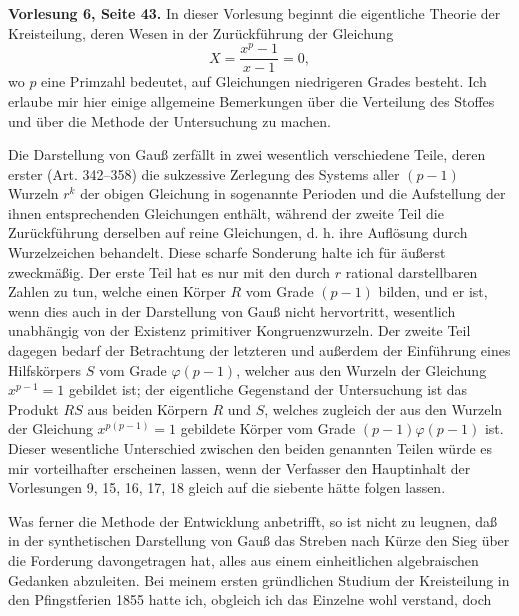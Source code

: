 \documentclass[11pt]{article}
\begin{document}
\textbf{Vorlesung 6, Seite 43.} In dieser Vorlesung beginnt die eigentliche Theorie der Kreisteilung, deren Wesen in der Zurückführung der Gleichung
\[
 X=\frac{x^p-1}{x-1}=0,
\]
wo $p$ eine Primzahl bedeutet, auf Gleichungen niedrigeren Grades besteht. Ich erlaube mir hier einige allgemeine Bemerkungen über die Verteilung des Stoffes und über die Methode der Untersuchung zu machen.

Die Darstellung von Gauß zerfällt in zwei wesentlich verschiedene Teile, deren erster (Art. 342--358) die sukzessive Zerlegung des Systems aller $(p-1)$ Wurzeln $r^k$ der obigen Gleichung in sogenannte Perioden und die Aufstellung der ihnen entsprechenden Gleichungen enthält, während der zweite Teil die Zurückführung derselben auf reine Gleichungen, d. h. ihre Auflösung durch Wurzelzeichen behandelt. Diese scharfe Sonderung halte ich für äußerst zweckmäßig. Der erste Teil hat es nur mit den durch $r$ rational darstellbaren Zahlen zu tun, welche einen Körper $R$ vom Grade $(p-1)$ bilden, und er ist, wenn dies auch in der Darstellung von Gauß nicht hervortritt, wesentlich unabhängig von der Existenz primitiver Kongruenzwurzeln. Der zweite Teil dagegen bedarf der Betrachtung der letzteren und außerdem der Einführung eines Hilfskörpers $S$ vom Grade $\varphi(p-1)$, welcher aus den Wurzeln der Gleichung $x^{p-1}=1$ gebildet ist; der eigentliche Gegenstand der Untersuchung ist das Produkt $RS$ aus beiden Körpern $R$ und $S$, welches zugleich der aus den Wurzeln der Gleichung $x^{p(p-1)}=1$ gebildete Körper vom Grade $(p-1)\varphi(p-1)$ ist. Dieser wesentliche Unterschied zwischen den beiden genannten Teilen würde es mir vorteilhafter erscheinen lassen, wenn der Verfasser den Hauptinhalt der Vorlesungen 9, 15, 16, 17, 18 gleich auf die siebente hätte folgen lassen.

Was ferner die Methode der Entwicklung anbetrifft, so ist nicht zu leugnen, daß in der synthetischen Darstellung von Gauß das Streben nach Kürze den Sieg über die Forderung davongetragen hat, alles aus einem einheitlichen algebraischen Gedanken abzuleiten. Bei meinem ersten gründlichen Studium der Kreisteilung in den Pfingstferien 1855 hatte ich, obgleich ich das Einzelne wohl verstand, doch
\end{document}
